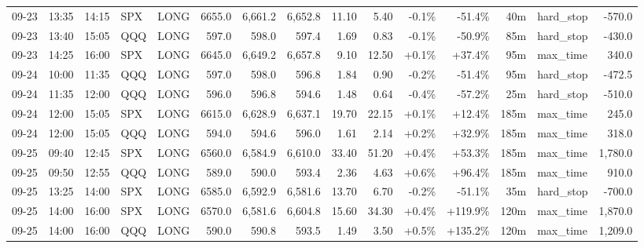 \documentclass[11pt,a4paper,twoside]{article}
\begin{document}
\begin{landscape}
\begin{center}
\begin{longtable}{>{\color{txtmain}}l l l l l r r r r r r r r >{\color{txtmain}}l r}
09-23 & 13:35 & 14:15 & SPX & LONG & 6655.0 & 6,661.2 & 6,652.8 & 11.10 & 5.40 & \textcolor{lossred}{-0.1\%} & \textcolor{lossred}{-51.4\%} & 40m & hard\_stop & \textcolor{lossred}{-570.0} \\
09-23 & 13:40 & 15:05 & QQQ & LONG & 597.0 & 598.0 & 597.4 & 1.69 & 0.83 & \textcolor{lossred}{-0.1\%} & \textcolor{lossred}{-50.9\%} & 85m & hard\_stop & \textcolor{lossred}{-430.0} \\
09-23 & 14:25 & 16:00 & SPX & LONG & 6645.0 & 6,649.2 & 6,657.8 & 9.10 & 12.50 & \textcolor{wingreen}{+0.1\%} & \textcolor{wingreen}{+37.4\%} & 95m & max\_time & \textcolor{wingreen}{340.0} \\
09-24 & 10:00 & 11:35 & QQQ & LONG & 597.0 & 598.0 & 596.8 & 1.84 & 0.90 & \textcolor{lossred}{-0.2\%} & \textcolor{lossred}{-51.4\%} & 95m & hard\_stop & \textcolor{lossred}{-472.5} \\
09-24 & 11:35 & 12:00 & QQQ & LONG & 596.0 & 596.8 & 594.6 & 1.48 & 0.64 & \textcolor{lossred}{-0.4\%} & \textcolor{lossred}{-57.2\%} & 25m & hard\_stop & \textcolor{lossred}{-510.0} \\
09-24 & 12:00 & 15:05 & SPX & LONG & 6615.0 & 6,628.9 & 6,637.1 & 19.70 & 22.15 & \textcolor{wingreen}{+0.1\%} & \textcolor{wingreen}{+12.4\%} & 185m & max\_time & \textcolor{wingreen}{245.0} \\
09-24 & 12:00 & 15:05 & QQQ & LONG & 594.0 & 594.6 & 596.0 & 1.61 & 2.14 & \textcolor{wingreen}{+0.2\%} & \textcolor{wingreen}{+32.9\%} & 185m & max\_time & \textcolor{wingreen}{318.0} \\
09-25 & 09:40 & 12:45 & SPX & LONG & 6560.0 & 6,584.9 & 6,610.0 & 33.40 & 51.20 & \textcolor{wingreen}{+0.4\%} & \textcolor{wingreen}{+53.3\%} & 185m & max\_time & \textcolor{wingreen}{1,780.0} \\
09-25 & 09:50 & 12:55 & QQQ & LONG & 589.0 & 590.0 & 593.4 & 2.36 & 4.63 & \textcolor{wingreen}{+0.6\%} & \textcolor{wingreen}{+96.4\%} & 185m & max\_time & \textcolor{wingreen}{910.0} \\
09-25 & 13:25 & 14:00 & SPX & LONG & 6585.0 & 6,592.9 & 6,581.6 & 13.70 & 6.70 & \textcolor{lossred}{-0.2\%} & \textcolor{lossred}{-51.1\%} & 35m & hard\_stop & \textcolor{lossred}{-700.0} \\
09-25 & 14:00 & 16:00 & SPX & LONG & 6570.0 & 6,581.6 & 6,604.8 & 15.60 & 34.30 & \textcolor{wingreen}{+0.4\%} & \textcolor{wingreen}{+119.9\%} & 120m & max\_time & \textcolor{wingreen}{1,870.0} \\
09-25 & 14:00 & 16:00 & QQQ & LONG & 590.0 & 590.8 & 593.5 & 1.49 & 3.50 & \textcolor{wingreen}{+0.5\%} & \textcolor{wingreen}{+135.2\%} & 120m & max\_time & \textcolor{wingreen}{1,209.0} \\

\end{longtable}
\end{center}
\end{landscape}
\end{document}
